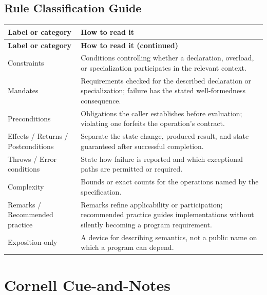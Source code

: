 \documentclass[11pt,letterpaper]{article}
\begin{document}
\subsection*{Rule Classification Guide}
\small\begin{longtable}{@{}>{\RaggedRight\arraybackslash}p{}>{\RaggedRight\arraybackslash}p{}@{}}\toprule\textbf{Label or category} & \textbf{How to read it}\\\midrule\endfirsthead\toprule\textbf{Label or category} & \textbf{How to read it (continued)}\\\midrule\endhead\bottomrule\endfoot
Constraints & Conditions controlling whether a declaration, overload, or specialization participates in the relevant context.\\
Mandates & Requirements checked for the described declaration or specialization; failure has the stated well-formedness consequence.\\
Preconditions & Obligations the caller establishes before evaluation; violating one forfeits the operation's contract.\\
Effects / Returns / Postconditions & Separate the state change, produced result, and state guaranteed after successful completion.\\
Throws / Error conditions & State how failure is reported and which exceptional paths are permitted or required.\\
Complexity & Bounds or exact counts for the operations named by the specification.\\
Remarks / Recommended practice & Remarks refine applicability or participation; recommended practice guides implementations without silently becoming a program requirement.\\
Exposition-only & A device for describing semantics, not a public name on which a program can depend.\\
\end{longtable}\normalsize
\section{Cornell Cue-and-Notes}
\end{document}
